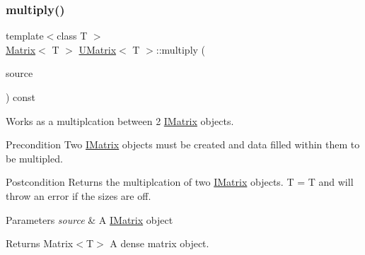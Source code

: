 \mbox{\label{class_u_matrix_ae9b6d52219a08ded85587635414ca7f2}} 
\subsubsection{\texorpdfstring{multiply()}{multiply()}\hspace{0.1cm}{\footnotesize\ttfamily [1/6]}}
{\footnotesize\ttfamily template$<$class T $>$ \\
\mbox{\hyperlink{class_matrix}{Matrix}}$<$ T $>$ \mbox{\hyperlink{class_u_matrix}{U\+Matrix}}$<$ T $>$\+::multiply (\begin{DoxyParamCaption}\item[{const \mbox{\hyperlink{class_i_matrix}{I\+Matrix}}$<$ \mbox{\hyperlink{class_matrix}{Matrix}}$<$ T $>$, T $>$ \&}]{source }\end{DoxyParamCaption}) const}



Works as a multiplcation between 2 \mbox{\hyperlink{class_i_matrix}{I\+Matrix}} objects. 

\begin{DoxyPrecond}{Precondition}
Two \mbox{\hyperlink{class_i_matrix}{I\+Matrix}} objects must be created and data filled within them to be multipled. 
\end{DoxyPrecond}
\begin{DoxyPostcond}{Postcondition}
Returns the multiplcation of two \mbox{\hyperlink{class_i_matrix}{I\+Matrix}} objects. T = T and will throw an error if the sizes are off.
\end{DoxyPostcond}

\begin{DoxyParams}{Parameters}
{\em source} & A \mbox{\hyperlink{class_i_matrix}{I\+Matrix}} object \\
\hline
\end{DoxyParams}
\begin{DoxyReturn}{Returns}
Matrix$<$\+T$>$ A dense matrix object. 
\end{DoxyReturn}
\mbox{\label{class_u_matrix_af2287fc1f226471b98347ad92c4ebf63}} 
